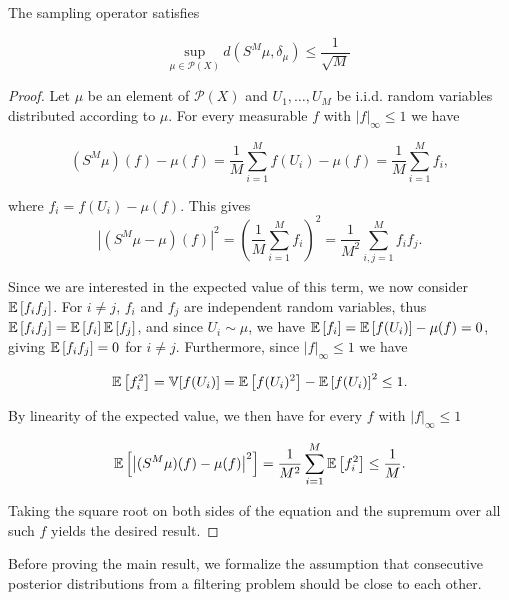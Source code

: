 \begin{lemma}\label{sampling-bound}
  The sampling operator satisfies

  \begin{equation*}
    \underset{\mu \in \mathcal{P}(X)}{\text{sup}}\ d(S^M\mu, \delta_\mu) \le \frac1{\sqrt{M}}
  \end{equation*}
\end{lemma}

\begin{proof}
  Let $\mu$ be an element of $\mathcal{P}(X)$ and $U_1, \ldots, U_M$ be i.i.d. random variables distributed according to $\mu$. For every measurable $f$ with $|f|_\infty \le 1$ we have 
  
  \begin{equation*}
    (S^M\mu)(f) - \mu(f) = \frac1{M}\sum_{i=1}^Mf(U_i) - \mu(f) = \frac1{M}\sum_{i=1}^Mf_i,
  \end{equation*}

  where $f_i = f(U_i) - \mu(f)$. This gives
  \begin{equation*}
    \left|(S^M\mu - \mu)(f)\right|^2
    = \left(\frac1{M}\sum_{i=1}^Mf_i\right)^2
    = \frac1{M^2}\sum_{i,j=1}^Mf_if_j.
  \end{equation*}

  Since we are interested in the expected value of this term, we now consider $\mathbb{E}\left[f_if_j\right]$. For $i \neq j$, $f_i$ and $f_j$ are independent random variables, thus $\mathbb{E}\left[f_if_j\right] = \mathbb{E}\left[f_i\right]\mathbb{E}\left[f_j\right]$, and since $U_i \sim \mu$, we have $\mathbb{E}\left[f_i\right] = \mathbb{E}\left[f(U_i)\right] - \mu(f) = 0$, giving $\mathbb{E}\left[f_if_j\right] = 0$ for $i \neq j$. Furthermore, since $|f|_\infty \le 1$ we have

  \begin{equation*}
    \mathbb{E}\left[f_i^2\right] = \mathbb{V}[f(U_i)] = \mathbb{E}\left[f(U_i)^2\right] - \mathbb{E}\left[f(U_i)\right]^2 \leq 1.
  \end{equation*}

  By linearity of the expected value, we then have for every $f$ with $|f|_\infty \le 1$

  \begin{equation*}
    \mathbb{E}\left[\left|(S^M\mu)(f) - \mu(f)\right|^2\right] = \frac1{M^2}\sum_{i=1}^M\mathbb{E}\left[f_i^2\right] \le \frac1{M}.
  \end{equation*}

  Taking the square root on both sides of the equation and the supremum over all such $f$ yields the desired result.
\end{proof}

Before proving the main result, we formalize the assumption that consecutive posterior distributions from a filtering problem should be close to each other.

